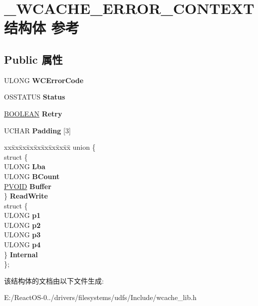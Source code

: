 \hypertarget{struct___w_c_a_c_h_e___e_r_r_o_r___c_o_n_t_e_x_t}{}\section{\+\_\+\+W\+C\+A\+C\+H\+E\+\_\+\+E\+R\+R\+O\+R\+\_\+\+C\+O\+N\+T\+E\+X\+T结构体 参考}
\label{struct___w_c_a_c_h_e___e_r_r_o_r___c_o_n_t_e_x_t}
\subsection*{Public 属性}
\begin{DoxyCompactItemize}
\item 
\mbox{\label{struct___w_c_a_c_h_e___e_r_r_o_r___c_o_n_t_e_x_t_aa07c917c2b1b213454f928d366326787}} 
U\+L\+O\+NG {\bfseries W\+C\+Error\+Code}
\item 
\mbox{\label{struct___w_c_a_c_h_e___e_r_r_o_r___c_o_n_t_e_x_t_a6f51f39be5dd2bf797a4770e2498f5b2}} 
O\+S\+S\+T\+A\+T\+US {\bfseries Status}
\item 
\mbox{\label{struct___w_c_a_c_h_e___e_r_r_o_r___c_o_n_t_e_x_t_a49f6f35188769c1a313a917896ebd6c6}} 
\hyperlink{_processor_bind_8h_a112e3146cb38b6ee95e64d85842e380a}{B\+O\+O\+L\+E\+AN} {\bfseries Retry}
\item 
\mbox{\label{struct___w_c_a_c_h_e___e_r_r_o_r___c_o_n_t_e_x_t_ae1c935ec28f2b1531d9d245df19e10a5}} 
U\+C\+H\+AR {\bfseries Padding} \mbox{[}3\mbox{]}
\item 
\mbox{\label{struct___w_c_a_c_h_e___e_r_r_o_r___c_o_n_t_e_x_t_adc9fa9cb7e5014d0aae381d3dbaf37e0}} 
\begin{tabbing}
xx\=xx\=xx\=xx\=xx\=xx\=xx\=xx\=xx\=\kill
union \{\\
\>struct \{\\
\>\>ULONG {\bfseries Lba}\\
\>\>ULONG {\bfseries BCount}\\
\>\>\hyperlink{interfacevoid}{PVOID} {\bfseries Buffer}\\
\>\} {\bfseries ReadWrite}\\
\>struct \{\\
\>\>ULONG {\bfseries p1}\\
\>\>ULONG {\bfseries p2}\\
\>\>ULONG {\bfseries p3}\\
\>\>ULONG {\bfseries p4}\\
\>\} {\bfseries Internal}\\
\}; \\

\end{tabbing}\end{DoxyCompactItemize}


该结构体的文档由以下文件生成\+:\begin{DoxyCompactItemize}
\item 
E\+:/\+React\+O\+S-\/0../drivers/filesystems/udfs/\+Include/wcache\+\_\+lib.\+h\end{DoxyCompactItemize}

